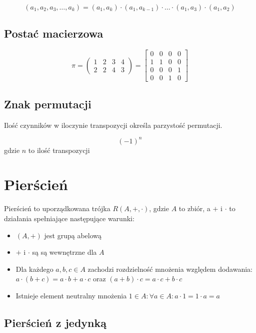 \documentclass{../notatki}
\begin{document}
$$
(a_1, a_2, a_3, \dots, a_k) = (a_1, a_k) \cdot (a_1, a_{k-1}) \cdot
\dots \cdot (a_1, a_3) \cdot (a_1, a_2)
$$

\subsection{Postać macierzowa}

$$
\pi =
\begin{pmatrix}
  1 & 2 & 3 & 4\\
  2 & 2 & 4 & 3
\end{pmatrix}
=
\begin{bmatrix}
  0 & 0 & 0 & 0\\
  1 & 1 & 0 & 0\\
  0 & 0 & 0 & 1\\
  0 & 0 & 1 & 0
\end{bmatrix}
$$

\subsection{Znak permutacji}

Ilość czynników w iloczynie transpozycji określa parzystość permutacji.

$$(-1)^n$$ gdzie $n$ to ilość transpozycji

\section{Pierścień}

Pierścień to uporządkowana trójka $R(A, +, \cdot)$, gdzie $A$ to
zbiór, a $+$ i $\cdot$ to działania spełniające następujące warunki:

\begin{itemize}
  \item $(A, +)$ jest grupą abelową
  \item $+$ i $\cdot$ są są wewnętrzne dla $A$
  \item Dla każdego $a, b, c \in A$ zachodzi rozdzielność mnożenia
    względem dodawania: $a \cdot (b + c) = a \cdot b + a \cdot c$
    oraz $(a + b) \cdot c = a \cdot c + b \cdot c$
  \item Istnieje element neutralny mnożenia $1 \in A: \forall a \in
    A: a \cdot 1 = 1 \cdot a = a$
\end{itemize}

\subsection{Pierścień z jedynką}
\end{document}
